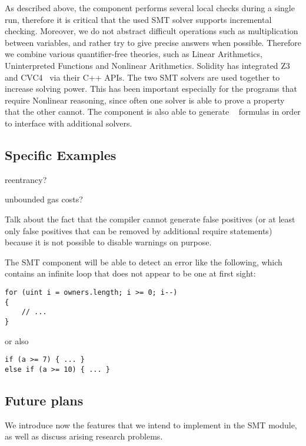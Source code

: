 As described above, the component performs several local checks during a single
run, therefore it is critical that the used SMT solver supports
incremental checking.
%
Moreover, we do not abstract difficult operations such as multiplication
between variables, and rather try to give precise answers when possible.
%
Therefore we combine various quantifier-free theories, such as Linear
Arithmetics, Uninterpreted Functions and Nonlinear Arithmetics. 
%
Solidity has integrated Z3~\cite{Z3} and CVC4~\cite{CVC4} via their C++ APIs.
%
The two SMT solvers are used together to increase solving power.
%
This has been important especially for the programs that require Nonlinear
reasoning, since often one solver is able to prove a property that the other
cannot.
%
The component is also able to generate ~\cite{SMTLIB}
formulas in order to interface with additional solvers.

\subsection{Specific Examples}


reentrancy?

unbounded gas costs?

Talk about the fact that the compiler cannot generate false
positives (or at least only false positives that can be removed
by additional require statements) because it is not possible to
disable warnings on purpose.

The SMT component will be able to detect an error like the following,
which contains an infinite loop that does not appear to be
one at first sight: 
\begin{verbatim}
for (uint i = owners.length; i >= 0; i--)
{
    // ...
}
\end{verbatim}

or also

\begin{verbatim}
if (a >= 7) { ... }
else if (a >= 10) { ... }
\end{verbatim}
    
\subsection{Future plans}

We introduce now the features that we intend to implement in the SMT module, as
well as discuss arising research problems.

